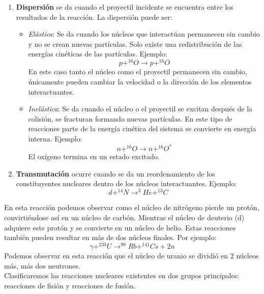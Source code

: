 \begin{enumerate}
    \item \textbf{Dispersión} se da cuando el proyectil incidente se encuentra entre los resultados de la reacción. La dispersión puede ser:
    \begin{itemize}
        \item \textit{Elástica}: Se da cuando los núcleos que interactúan permanecen sin cambio y no se crean nuevas partículas. Solo existe una redistribución de las energías cinéticas de las partículas. Ejemplo:
        \begin{equation*}
            p+^{16}O \longrightarrow p+^{16}O
        \end{equation*}
        En este caso tanto el núcleo como el proyectil permanecen sin cambio, únicamente pueden cambiar la velocidad o la dirección de los elementos interactuantes. 
    \item \textit{Inelástica}: Se da cuando el núcleo o el proyectil se excitan después de la colisión, se fracturan formando nuevas partículas. En este tipo de reacciones parte de la energía cinética del sistema se convierte en energía interna. Ejemplo:
    \begin{equation*}
         n+^{16}O \longrightarrow n+^{16}O^*
    \end{equation*}
    El oxígeno termina en un estado excitado. 
    \end{itemize}
 \item \textbf{Transmutación} ocurre cuando se da un reordenamiento de los constituyentes nucleares dentro de los núcleos interactuantes. Ejemplo:
 \begin{equation*}
         d+^{14}N \longrightarrow ^{3}He+^{13}C
    \end{equation*}
\end{enumerate}
En esta reacción podemos observar como el núcleo de nitrógeno pierde un protón, convirtiéndose así en un núcleo de carbón. Mientras el núcleo de deuterio (d) adquiere este protón y se convierte en un núcleo de helio. 
Estas reacciones también pueden resultar en más de dos núcleos finales. Por ejemplo:
 \begin{equation*}
         \gamma+^{233}U \longrightarrow ^{90}Rb+^{141}Cs+2n
    \end{equation*}
Podemos observar en esta reacción que el núcleo de uranio se dividió en 2 núcleos más, más dos neutrones. \cite{Sanctis.2016}\\

Clasificaremos las reacciones nucleares existentes en dos grupos principales: reacciones de fisión y reacciones de fusión.



